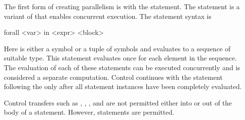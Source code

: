 The first form of creating parallelism is with the 
statement. The  statement is a variant of  that 
enables concurrent execution. The  statement syntax is
\begin{chapel}
[ordered] forall <var> in <expr> <block>
\end{chapel}
Here  is either a symbol or a tuple of symbols and
 evaluates to a sequence of suitable type. This
statement evaluates  once for each element in the
sequence. The evaluation of each of these statements can be executed
concurrently and is considered a separate computation. Control
continues with the statement following the  only after
all statement instances have been completely evaluated.

Control transfers such as , , ,
and  are not permitted either into or out of the body of
a  statement.  However,  statements are permitted.
